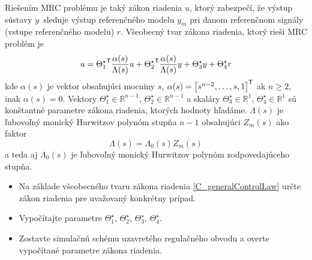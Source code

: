 \documentclass[a4paper, 10pt, ]{article}
\begin{document}
\begin{enumerate}[leftmargin=0pt, labelsep=4mm, itemsep=0pt]
    Riešením MRC problému je taký zákon riadenia $u$, ktorý zabezpečí, že výstup sústavy $y$~sleduje výstup referenčného modelu $y_m$ pri danom referenčnom signály (vstupe referenčného modelu) $r$. Všeobecný tvar zákona riadenia, ktorý rieši MRC problém je
    \begin{equation} \label{C_generalControlLaw}
    	u = {\Theta_1^\star}^{\mathsf{T}} \frac{\alpha(s)}{\Lambda(s)} u + {\Theta_2^\star}^{\mathsf{T}} \frac{\alpha(s)}{\Lambda(s)} y + \Theta_3^\star y + \Theta_4^\star r
    \end{equation}
    kde $\alpha(s)$ je vektor obsahujúci mocniny $s$, $\alpha(s) = \begin{bmatrix} s^{n-2}, \ldots,s, 1 \end{bmatrix}^{\mathsf{T}}$ ak $n\geq 2$, inak $\alpha(s) = 0$. Vektory $\Theta_1^\star \in \mathbb{R}^{n-1}$, $\Theta_2^\star \in \mathbb{R}^{n-1}$ a skaláry $\Theta_3^\star \in \mathbb{R}^1$, $\Theta_4^\star \in \mathbb{R}^1$ sú konštantné parametre zákona riadenia, ktorých hodnoty hľadáme.  $\Lambda(s)$ je ľubovoľný monický Hurwitzov polynóm stupňa $n-1$ obsahujúci $Z_m(s)$ ako faktor
    \begin{equation}
    	\Lambda(s) = \Lambda_0(s) Z_m(s)
    \end{equation}
    a teda aj $\Lambda_0(s)$ je ľubovoľný monický Hurwitzov polynóm zodpovedajúceho stupňa.


    \begin{itemize}[leftmargin=0pt, labelsep=4mm, itemsep=0pt]
    	\item Na základe všeobecného tvaru zákona riadenia \eqref{C_generalControlLaw} určte zákon riadenia pre uvažovaný konkrétny prípad.
    	\item Vypočítajte parametre $\Theta_1^\star$, $\Theta_2^\star$, $\Theta_3^\star$, $\Theta_4^\star$.
    	\item Zostavte simulačnú schému uzavretého regulačného obvodu a overte vypočítané parametre zákona riadenia.
    \end{itemize}





\end{enumerate}
\end{document}
